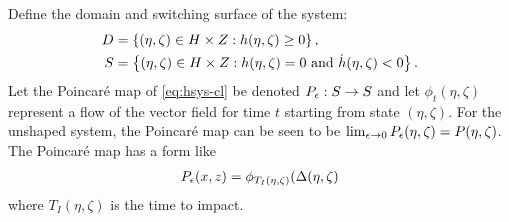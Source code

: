 \documentclass[twocolumn]{article}
\begin{document}
Define the domain and switching surface of the system:
\begin{align}
  D &= \left\{ (\eta, \zeta) \in H \times Z : h(\eta, \zeta) \geq 0 \right\},\\
  \nonumber
  S &= \left\{ (\eta, \zeta) \in H \times Z : h(\eta, \zeta) = 0 \mbox{ and } {\dot h}(\eta, \zeta) < 0 \right\}.
\end{align}
Let the Poincar{\'e} map of \eqref{eq:hsys-cl} be denoted $P_{\epsilon} : S \to S$ and let $\phi_{t}(\eta, \zeta)$ represent a flow of the vector field for time $t$ starting from state $(\eta, \zeta)$.
%
For the unshaped system, the Poincar{\'e} map can be seen to be $\lim_{\epsilon \to 0} P_{\epsilon}(\eta, \zeta) = P(\eta, \zeta)$.
%
The Poincar{\'e} map has a form like
\begin{align}
  P_{\epsilon}(x, z) = \phi_{T_{I}(\eta, \zeta)}(\Delta(\eta, \zeta)
\end{align}
where $T_{I}(\eta, \zeta)$ is the time to impact.
\end{document}
